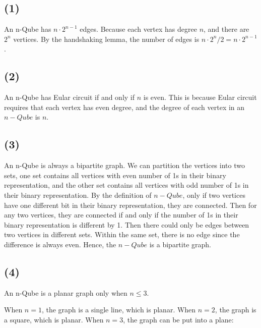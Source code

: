 \documentclass[a4paper,12pt]{article}
\begin{document}
\subsection*{(1)}

An n-Qube has $n \cdot 2^{n-1}$ edges.
Because each vertex has degree $n$, and there are $2^{n}$ vertices.
By the handshaking lemma, the number of edges is $n \cdot 2^{n} / 2 = n \cdot 2^{n-1}$.

\subsection*{(2)}

An n-Qube has Eular circuit if and only if $n$ is even.
This is because Eular circuit requires that each vertex has even degree, and the degree of each vertex in an $n-Qube$ is $n$.

\subsection*{(3)}

An n-Qube is always a bipartite graph.
We can partition the vertices into two sets, one set contains all vertices with even number of 1s in their binary representation, and the other set contains all vertices with odd number of 1s in their binary representation.
By the definition of $n-Qube$, only if two vertices have one different bit in their binary representation, they are connected.
Then for any two vertices, they are connected if and only if the number of 1s in their binary representation is different by 1.
Then there could only be edges between two vertices in different sets.
Within the same set, there is no edge since the difference is always even.
Hence, the $n-Qube$ is a bipartite graph.

\subsection*{(4)}

An n-Qube is a planar graph only when $n \leq 3$.

When $n = 1$, the graph is a single line, which is planar.
When $n = 2$, the graph is a square, which is planar.
When $n = 3$, the graph can be put into a plane:
\begin{center}
\end{center}
\end{document}
